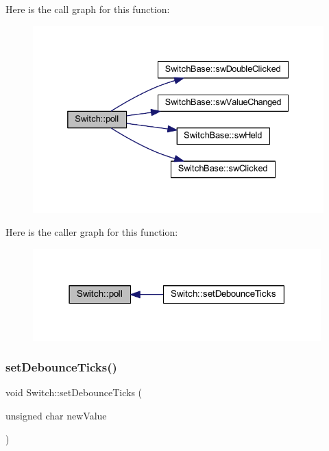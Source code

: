 Here is the call graph for this function\+:
\nopagebreak
\begin{figure}[H]
\begin{center}
\leavevmode
\includegraphics[width=332pt]{d9/d47/class_switch_a5401c79fd9fda679eae5e4bba5578a35_cgraph}
\end{center}
\end{figure}
Here is the caller graph for this function\+:
\nopagebreak
\begin{figure}[H]
\begin{center}
\leavevmode
\includegraphics[width=315pt]{d9/d47/class_switch_a5401c79fd9fda679eae5e4bba5578a35_icgraph}
\end{center}
\end{figure}
\mbox{\label{class_switch_ad1991a92a3b5c470d667a5e26c59ef59}} 
\subsubsection{\texorpdfstring{set\+Debounce\+Ticks()}{setDebounceTicks()}}
{\footnotesize\ttfamily void Switch\+::set\+Debounce\+Ticks (\begin{DoxyParamCaption}\item[{unsigned char}]{new\+Value }\end{DoxyParamCaption})\hspace{0.3cm}{\ttfamily [inline]}}



